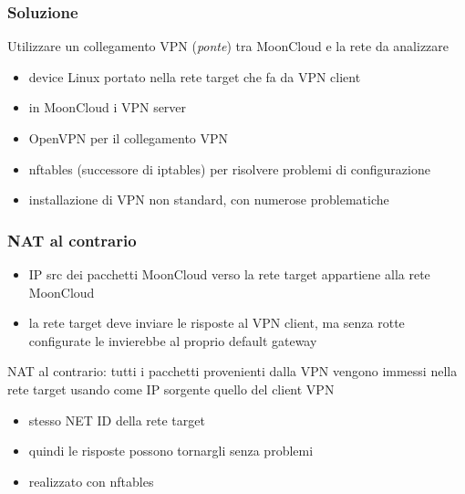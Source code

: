 \begin{frame}
	\frametitle{Soluzione}
	Utilizzare un collegamento \alert{VPN} (\textit{ponte}) tra MoonCloud e
	la rete da analizzare
	    
	\begin{itemize}
		\item device \alert{Linux} portato nella rete target che fa da VPN client
		\item in MoonCloud i \alert{VPN server}
		\item \alert{OpenVPN} per il collegamento VPN 
		\item \alert{nftables} (successore
		      di \alert{iptables}) per risolvere problemi di configurazione
		      		      
	\end{itemize}
	    
	\begin{itemize}
		\item installazione di \alert{VPN non standard}, con numerose problematiche 
	\end{itemize}
\end{frame}


\begin{frame}
	\frametitle{NAT al contrario}
	
	\begin{itemize}
		\item IP src dei pacchetti MoonCloud verso la rete target
		      appartiene alla rete MoonCloud
		\item la rete target deve inviare le risposte al VPN client, ma senza
		      rotte configurate le invierebbe al proprio default gateway
	\end{itemize}
	
	\alert{NAT al contrario}: tutti i pacchetti provenienti dalla VPN vengono
	immessi nella rete target usando come IP sorgente quello del client VPN
	\begin{itemize}
		\item stesso NET ID della rete target
		\item quindi le risposte possono tornargli senza problemi
		\item realizzato con \alert{nftables}
	\end{itemize}
\end{frame}

